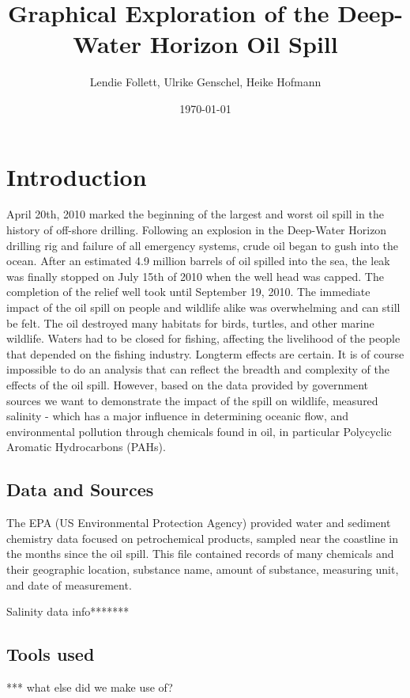 \documentclass[authoryear,12pt]{elsarticle}
\title{Graphical Exploration of the Deep-Water Horizon Oil Spill}
\author{Lendie Follett, Ulrike Genschel, Heike Hofmann}
\date{\today}                                           %
\begin{document}
\maketitle
\begin{abstract}
\end{abstract}
\section{Introduction}
April 20th, 2010 marked the beginning of the largest and worst oil spill in the history of off-shore drilling.  Following an explosion in the Deep-Water Horizon drilling rig and failure of all emergency systems, crude oil began to gush into the ocean.  After an estimated 4.9 million barrels of oil spilled into the sea, the leak was finally stopped on July 15th of 2010 when the well head was capped.  The completion of the relief well took until September 19, 2010.  The immediate impact of the oil spill on people and wildlife alike was overwhelming and can still be felt.  The oil destroyed many habitats for birds, turtles, and other marine wildlife.  Waters had to be closed for fishing, affecting the livelihood of the people that depended on the fishing industry. Longterm effects are certain. It is of course impossible to do an analysis that can reflect the breadth and complexity of the effects of the oil spill.  However, based on the data provided by government sources we want to demonstrate the impact of the spill on wildlife, measured salinity - which has a major influence in determining oceanic flow, and environmental pollution through chemicals found in oil, in particular Polycyclic Aromatic Hydrocarbons (PAHs). 

\subsection{Data and Sources}


The EPA (US Environmental  Protection Agency) provided water and sediment chemistry data focused on petrochemical products, sampled near the coastline in the months since the oil spill. This file contained records of many chemicals and their geographic location, substance name, amount of substance, measuring unit, and date of measurement. 

Salinity data info*******

\subsection{Tools used}
*** what else did we make use of?
\end{document}
